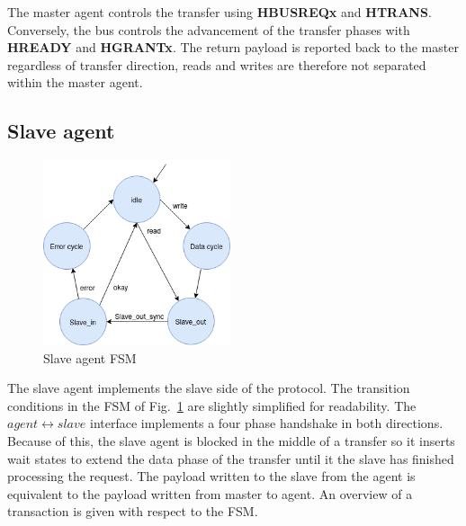 The master agent controls the transfer using \textbf{HBUSREQx} and \textbf{HTRANS}. Conversely, the bus controls the advancement of the transfer phases with \textbf{HREADY} and \textbf{HGRANTx}. The return payload is reported back to the master regardless of transfer direction, reads and writes are therefore not separated within the master agent.  


\newpage
\subsection{Slave agent}
\begin{figure}
\includegraphics[width=5.5cm]{figs/hw/sAgent_FSM.png}
\caption{Slave agent FSM}\label{fig:rsfsm}
\end{figure}  

The slave agent implements the slave side of the protocol. The transition conditions in the FSM of Fig.~\ref{fig:rsfsm} are slightly simplified for readability. 
The $agent\leftrightarrow slave$ interface implements a four phase handshake in both directions. Because of this, the slave agent is blocked in the middle of a transfer so it inserts wait states to extend the data phase of the transfer until it the slave has finished processing the request. The payload written to the slave from the agent is equivalent to the payload written from master to agent. An overview of a transaction is given with respect to the FSM.\par
 \vspace{1cm} 

